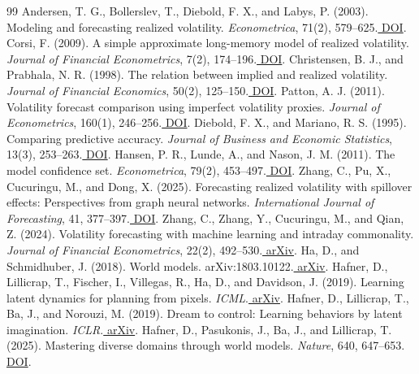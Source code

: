 \documentclass[11pt]{article}
\begin{document}
\clearpage

\begin{thebibliography}{99}
 Andersen, T. G., Bollerslev, T., Diebold, F. X., and Labys, P. (2003). Modeling and forecasting realized volatility. \emph{Econometrica}, 71(2), 579--625.\href{https://doi.org/10.1111/1468-0262.00418}{ DOI}.
 Corsi, F. (2009). A simple approximate long-memory model of realized volatility. \emph{Journal of Financial Econometrics}, 7(2), 174--196.\href{https://doi.org/10.1093/jjfinec/nbp001}{ DOI}.
 Christensen, B. J., and Prabhala, N. R. (1998). The relation between implied and realized volatility. \emph{Journal of Financial Economics}, 50(2), 125--150.\href{https://doi.org/10.1016/S0304-405X(98)00034-8}{ DOI}.
 Patton, A. J. (2011). Volatility forecast comparison using imperfect volatility proxies. \emph{Journal of Econometrics}, 160(1), 246--256.\href{https://doi.org/10.1016/j.jeconom.2010.03.034}{ DOI}.
 Diebold, F. X., and Mariano, R. S. (1995). Comparing predictive accuracy. \emph{Journal of Business and Economic Statistics}, 13(3), 253--263.\href{https://doi.org/10.1080/07350015.1995.10524599}{ DOI}.
 Hansen, P. R., Lunde, A., and Nason, J. M. (2011). The model confidence set. \emph{Econometrica}, 79(2), 453--497.\href{https://doi.org/10.3982/ECTA5771}{ DOI}.
 Zhang, C., Pu, X., Cucuringu, M., and Dong, X. (2025). Forecasting realized volatility with spillover effects: Perspectives from graph neural networks. \emph{International Journal of Forecasting}, 41, 377--397.\href{https://doi.org/10.1016/j.ijforecast.2024.09.002}{ DOI}.
 Zhang, C., Zhang, Y., Cucuringu, M., and Qian, Z. (2024). Volatility forecasting with machine learning and intraday commonality. \emph{Journal of Financial Econometrics}, 22(2), 492--530.\href{https://arxiv.org/abs/2202.08962}{ arXiv}.
 Ha, D., and Schmidhuber, J. (2018). World models. arXiv:1803.10122.\href{https://arxiv.org/abs/1803.10122}{ arXiv}.
 Hafner, D., Lillicrap, T., Fischer, I., Villegas, R., Ha, D., and Davidson, J. (2019). Learning latent dynamics for planning from pixels. \emph{ICML}.\href{https://arxiv.org/abs/1811.04551}{ arXiv}.
 Hafner, D., Lillicrap, T., Ba, J., and Norouzi, M. (2019). Dream to control: Learning behaviors by latent imagination. \emph{ICLR}.\href{https://arxiv.org/abs/1912.01603}{ arXiv}.
 Hafner, D., Pasukonis, J., Ba, J., and Lillicrap, T. (2025). Mastering diverse domains through world models. \emph{Nature}, 640, 647--653.\href{https://doi.org/10.1038/s41586-025-08744-2}{ DOI}.

\end{thebibliography}
\end{document}
